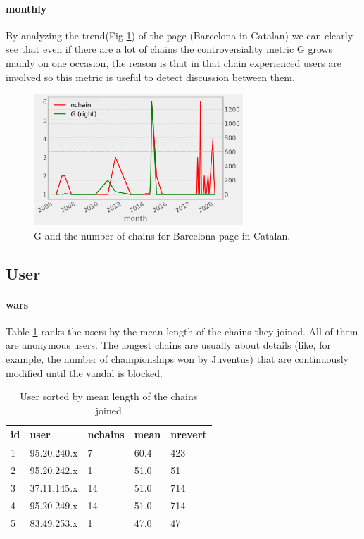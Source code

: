 \paragraph*{monthly}
By analyzing the trend(Fig \ref{fig:chainsuser}) of the page (Barcelona in Catalan) we can clearly
see that even if there are a lot of chains the controversiality metric G grows mainly on one
occasion, the reason is that in that chain experienced users are involved so this metric is useful
to detect discussion between them.
\begin{figure}[H]
    \centering
    \includegraphics[width=0.7\textwidth]{./chapters/04/assets/chains_page.png}
    \caption{G and the number of chains for Barcelona page in Catalan.}
    \label{fig:chainsuser}
\end{figure}

\subsection{User}
\paragraph*{wars}
Table \ref{table:mean} ranks the users by the mean length of the chains they joined. All of them are anonymous users.
The longest chains are usually about details (like, for example, the number of championships won by Juventus) that are
continuously modified until the vandal is blocked.

\begin{table}[H]
    \centering
    \begin{tabularx}{\columnwidth}{@{}Xllll@{}}
        \midrule
        \textbf{id}& \textbf{user} & \textbf{nchains} & \textbf{mean}& \textbf{nrevert}  \\ \toprule
        1 & 95.20.240.x & 7  & 60.4 & 423 \\
        2 & 95.20.242.x & 1  & 51.0 & 51  \\
        3 & 37.11.145.x & 14  & 51.0 & 714  \\
        4 & 95.20.249.x & 14  & 51.0 & 714  \\
        5 & 83.49.253.x & 1  & 47.0 & 47 \\
        
         \bottomrule
    \end{tabularx}
    
    \caption{User sorted by mean length of the chains joined \label{table:mean}}
\end{table}


